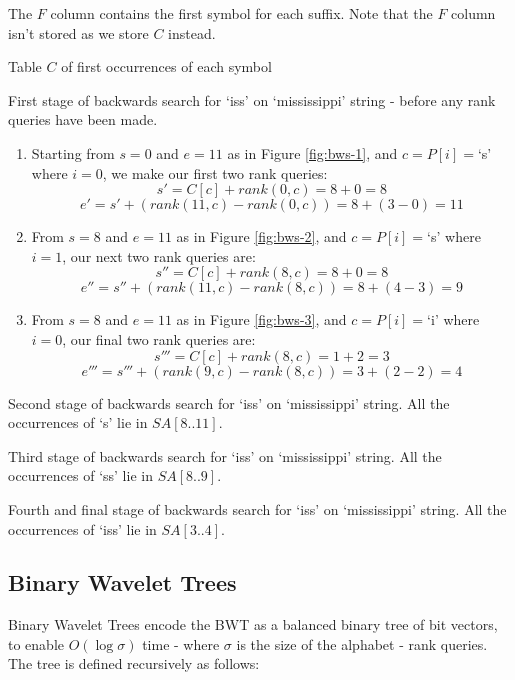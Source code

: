 The $F$ column contains the first symbol for each suffix. Note that the $F$ 
column isn't stored as we store $C$ instead.

			{Table $C$ of first occurrences of each symbol}
			
			{First stage of backwards search for `iss' on `mississippi'
			 string - before any rank queries have been made.}


\begin{enumerate}
	\item
		Starting from $s = 0$ and $e = 11$ as in Figure \ref{fig:bws-1},
		and $c = P[i] = $`s' where $i = 0$, we make our first two rank queries:
			$$s' = C[c] + rank(0, c) = 8 + 0 = 8$$
			$$e' = s' + (rank(11, c) - rank(0, c)) = 8 + (3 - 0) = 11$$
	\item
		From $s = 8$ and $e = 11$ as in Figure \ref{fig:bws-2},
		and $c = P[i] = $`s' where $i = 1$, our next two rank queries are:
			$$s'' = C[c] + rank(8, c) = 8 + 0 = 8$$
			$$e'' = s'' + (rank(11, c) - rank(8, c)) = 8 + (4 - 3) = 9$$
	\item
		From $s = 8$ and $e = 11$ as in Figure \ref{fig:bws-3},
		and $c = P[i] = $`i' where $i = 0$, our final two rank queries are:
			$$s''' = C[c] + rank(8, c) = 1 + 2 = 3$$
			$$e''' = s''' + (rank(9, c) - rank(8, c)) = 3 + (2 - 2) = 4$$
\end{enumerate}

			{Second stage of backwards search for `iss' on `mississippi'
			string. All the occurrences of `s' lie in $SA[8..11]$.}

			{Third stage of backwards search for `iss' on `mississippi'
			string. All the occurrences of `ss' lie in $SA[8..9]$.}

			{Fourth and final stage of backwards search for `iss' on
			`mississippi' string. All the occurrences of `iss' lie in
			$SA[3..4]$.}

\clearpage
\subsection{Binary Wavelet Trees}
Binary Wavelet Trees encode the BWT as a balanced binary tree of bit vectors, to 
enable $O(\log \sigma)$ time - where $\sigma$ is the size of the alphabet - rank 
queries. The tree is defined recursively as follows:


